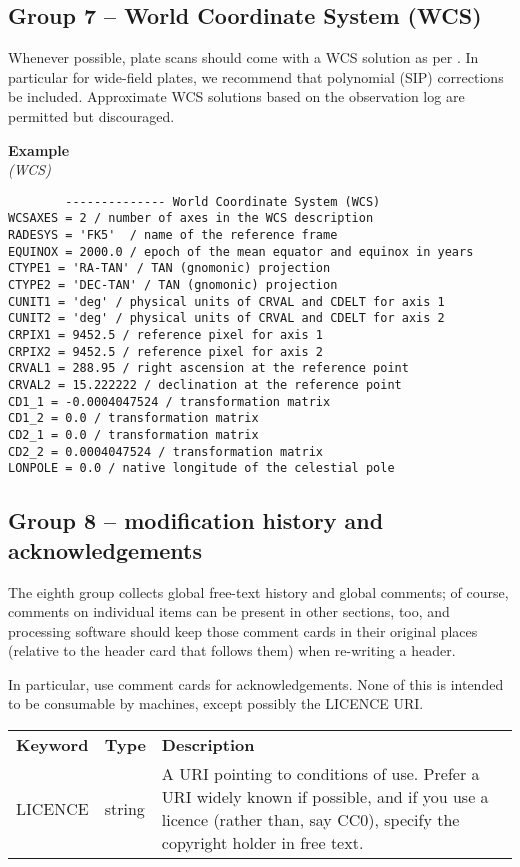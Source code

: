 \documentclass[11pt]{ivoa}
\newenvironment{fitsexample}[1]
{\bigskip\noindent\textbf{Example}\\\textit{(#1)\smallskip}}
{\medskip}
\begin{document}
\subsection{Group 7 – World Coordinate System (WCS)}

Whenever possible, plate scans should come with a WCS solution as per
\citet{2002A&A...395.1077C}.  In particular for wide-field plates, we
recommend that polynomial (SIP) corrections be included.  Approximate
WCS solutions based on the observation log are permitted but
discouraged.

\begin{fitsexample}{WCS}
\begin{lstlisting}
        -------------- World Coordinate System (WCS)
WCSAXES = 2 / number of axes in the WCS description
RADESYS = 'FK5'  / name of the reference frame
EQUINOX = 2000.0 / epoch of the mean equator and equinox in years
CTYPE1 = 'RA-TAN' / TAN (gnomonic) projection
CTYPE2 = 'DEC-TAN' / TAN (gnomonic) projection
CUNIT1 = 'deg' / physical units of CRVAL and CDELT for axis 1
CUNIT2 = 'deg' / physical units of CRVAL and CDELT for axis 2
CRPIX1 = 9452.5 / reference pixel for axis 1
CRPIX2 = 9452.5 / reference pixel for axis 2
CRVAL1 = 288.95 / right ascension at the reference point
CRVAL2 = 15.222222 / declination at the reference point
CD1_1 = -0.0004047524 / transformation matrix
CD1_2 = 0.0 / transformation matrix
CD2_1 = 0.0 / transformation matrix
CD2_2 = 0.0004047524 / transformation matrix
LONPOLE = 0.0 / native longitude of the celestial pole
\end{lstlisting}
\end{fitsexample}


\subsection{Group 8 – modification history and acknowledgements}

The eighth group collects global free-text history and global comments; of
course, comments on individual items can be present in other sections,
too, and processing software should keep those comment cards in their
original places (relative to the header card that follows them) when
re-writing a header.

In particular, use comment cards for acknowledgements.  None of this is
intended to be consumable by machines, except possibly the LICENCE URI.

\begin{inlinetable}
\footnotesize
\begin{tabular}{llp{}}
\sptablerule
\textbf{Keyword}&\textbf{Type}&\textbf{Description}\\
\sptablerule
LICENCE &string    &A URI pointing to conditions of use.  Prefer a
URI widely known if possible, and if you use a licence (rather than, say
CC0), specify the copyright holder in free text.\\
\end{tabular}
\end{inlinetable}
\end{document}
